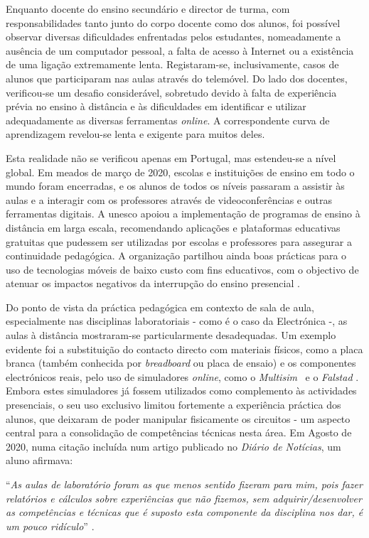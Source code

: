 Enquanto docente do ensino secundário e director de turma, com responsabilidades tanto junto do corpo docente como dos alunos, foi possível observar diversas dificuldades enfrentadas pelos estudantes, nomeadamente a ausência de um computador pessoal, a falta de acesso à Internet ou a existência de uma ligação extremamente lenta. Registaram-se, inclusivamente, casos de alunos que participaram nas aulas através do telemóvel. Do lado dos docentes, verificou-se um desafio considerável, sobretudo devido à falta de experiência prévia no ensino à distância e às dificuldades em identificar e utilizar adequadamente as diversas ferramentas \textit{online}. A correspondente curva de aprendizagem revelou-se lenta e exigente para muitos deles.

Esta realidade não se verificou apenas em Portugal, mas estendeu-se a nível global. Em meados de março de 2020, escolas e instituições de ensino em todo o mundo foram encerradas, e os alunos de todos os níveis passaram a assistir às aulas e a interagir com os professores através de videoconferências e outras ferramentas digitais. A \acrfull{unesco} apoiou a implementação de programas de ensino à distância em larga escala, recomendando aplicações e plataformas educativas gratuitas que pudessem ser utilizadas por escolas e professores para assegurar a continuidade pedagógica. A organização partilhou ainda boas prácticas para o uso de tecnologias móveis de baixo custo com fins educativos, com o objectivo de atenuar os impactos negativos da interrupção do ensino presencial \cite{unesco}.

Do ponto de vista da práctica pedagógica em contexto de sala de aula, especialmente nas disciplinas laboratoriais - como é o caso da Electrónica -, as aulas à distância mostraram-se particularmente desadequadas. Um exemplo evidente foi a substituição do contacto directo com materiais físicos, como a placa branca (também conhecida por \textit{breadboard} ou placa de ensaio) e os componentes electrónicos reais, pelo uso de simuladores \textit{online}, como o \textit{Multisim}~\cite{multisim} e o \textit{Falstad} \cite{falstad}. Embora estes simuladores já fossem utilizados como complemento às actividades presenciais, o seu uso exclusivo limitou fortemente a experiência práctica dos alunos, que deixaram de poder manipular fisicamente os circuitos - um aspecto central para a consolidação de competências técnicas nesta área. Em Agosto de 2020, numa citação incluída num artigo publicado no \textit{Diário de Notícias}, um aluno afirmava:
\begin{center}
    ``\textit{As aulas de laboratório foram as que menos sentido fizeram para mim, pois fazer relatórios e cálculos sobre experiências que não fizemos, sem adquirir/desenvolver as competências e técnicas que é suposto esta componente da disciplina nos dar, é um pouco ridículo}'' \cite{impactonegativocovid}.
\end{center}

